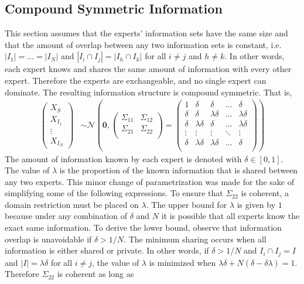\documentclass[11pt]{article}
\theoremstyle{definition}
\theoremstyle{definition}
\begin{document}
\subsection{Compound Symmetric Information}
\label{compound}

This section assumes that the experts' information sets have the same size and that the amount of overlap between any two information sets is constant, i.e.  $|I_{1}| =  \dots = |I_{N}|$ and $|I_{i} \cap I_{j}| = |I_{h} \cap I_{k}|$ for all $i \neq j$ and $h \neq k$. In other words, each expert knows and shares the same amount of information with every other expert. Therefore the experts are exchangeable, and no single expert can dominate. The resulting information structure is compound symmetric. That is,
\begin{align*}
\left(\begin{matrix} X_{S} \\ X_{I_1}\\ \vdots \\ X_{I_N} \end{matrix}\right) &\sim \mathcal{N}\left( 
 \boldsymbol{0}, \left(\begin{matrix} 
\Sigma_{11} & \Sigma_{12}\\
\Sigma_{21} & \Sigma_{22}\\
 \end{matrix}\right) 
 =
 \left(\begin{array}{c|cccc}
1 & \delta & \delta & \dots & \delta  \\ \hline
\delta & \delta &\lambda\delta & \dots & \lambda\delta   \\ 
\delta & \lambda\delta & \delta & \dots & \lambda\delta  \\ 
\vdots & \vdots & \vdots & \ddots & \vdots  \\ 
\delta & \lambda\delta & \lambda\delta & \dots & \delta\\ 
 \end{array}\right)\right)
\end{align*}
The amount of information known by each expert is denoted with $\delta \in [0,1]$. The value of $\lambda$ is the proportion of the known information that is shared between any two experts.  This minor change of parametrization was made for the sake of simplifying some of the following expressions. To ensure that $\Sigma_{22}$ is coherent, a domain restriction must be placed on $\lambda$. The upper bound for $\lambda$ is given by $1$ because under any combination of $\delta$ and $N$ it is possible that all experts know the exact same information. To derive the lower bound, observe that information overlap is unavoidable if $\delta > 1/N$. The minimum sharing occurs when all information is either shared or private. In other words, if $\delta > 1/N$ and $I_{i} \cap I_j = I$ and $|I| =  \lambda \delta$ for all $i \neq j$, the value of $\lambda$ is minimized when $\lambda\delta + N(\delta - \delta\lambda) = 1$. Therefore $\Sigma_{22}$ is coherent as long as
\end{document}
